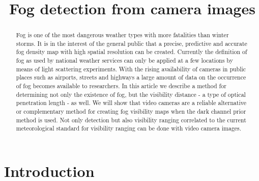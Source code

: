 \documentclass{article}
\title{Fog detection from camera images}
\begin{document}
\begin{abstract}

Fog is one of the most dangerous weather types with more fatalities than winter storms. It is in the interest of the general public that a precise, predictive and accurate fog density map with high spatial resolution can be created. Currently the definition of fog as used by national weather services can only be applied at a few locations by means of light scattering experiments. With the rising availability of cameras in public places such as airports, streets and highways a large amount of data on the occurrence of fog becomes available to researchers. In this article we describe a method for determining not only the existence of fog, but the visibility distance - a type of optical penetration length - as well. We will show that video cameras are a reliable alternative or complementary method for creating fog visibility maps when the dark channel prior method is used. Not only detection but also visibility ranging correlated to the current meteorological standard for visibility ranging can be done with video camera images. 
\end{abstract}

\section{Introduction}
\end{document}
